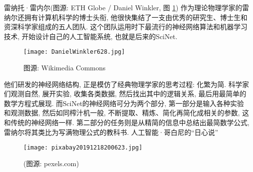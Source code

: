 雷纳托·雷内尔(图源: ETH Globe / Daniel Winkler, 图 \ref{DanielWinkler628fig15})
作为理论物理学家的雷纳尔还拥有计算机科学的博士头衔, 他很快集结了一支由优秀的研究生、博士生和资深科学家组成的五人团队. 这个团队运用时下最流行的神经网络算法和机器学习技术, 开始设计自己的人工智能系统, 也就是后来的SciNet.
\begin{figure}[H]
\centering
\texttt{[image: DanielWinkler628.jpg]}
\caption{图源: Wikimedia Commons}
\label{DanielWinkler628fig15}
\end{figure}
他们研发的神经网络结构, 正是模仿了经典物理学家的思考过程: 化繁为简.
科学家们观测自然, 展开实验, 收集各类数据, 然后找出其中的逻辑关系, 最后用最简单的数学方程式展现. 而SciNet的神经网络可分为两个部分, 第一部分是输入各种实验和观测数据, 然后如同榨汁机一般, 不断提取、精炼、简化再简化成相关的参数, 这和传统的神经网络一样. 第二部分的任务则是从精简的信息中总结出最简数学公式, 雷纳尔将其类比为写满物理公式的教科书.
人工智能·哥白尼的“日心说”
\begin{figure}[H]
\centering
\texttt{[image: pixabay20191218200623.jpg]}
\caption{(图源: pexels.com)}
\label{pixabay20191218200623}
\end{figure}

